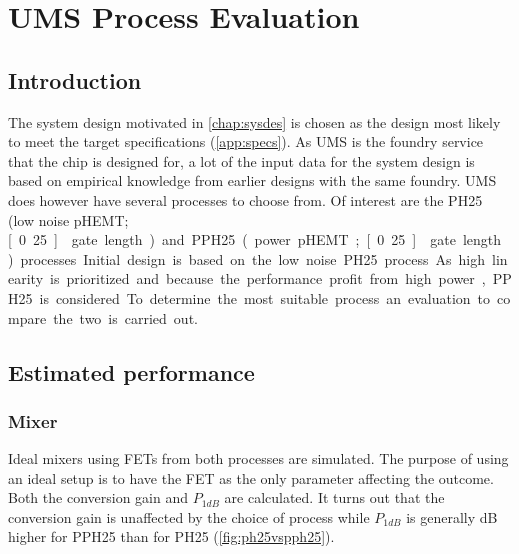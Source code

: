 \chapter{UMS Process Evaluation}\label{sec:processval}
	\section{Introduction}
		The system design motivated in \autoref{chap:sysdes} is chosen as the design most likely to meet the target specifications (\autoref{app:specs}). As UMS is the foundry service that the chip is designed for, a lot of the input data for the system design is based on empirical knowledge from earlier designs with the same foundry. UMS does however have several processes to choose from. Of interest are the PH25 (low noise pHEMT; \unit[0.25]{\mum} gate length) and PPH25 (power pHEMT; \unit[0.25]{\mum} gate length) processes.

		Initial design is based on the low noise PH25 process. As high linearity is prioritized and because the performance profit from high power, PPH25 is considered. To determine the most suitable process an evaluation to compare the two is carried out.

	\section{Estimated performance}

		\subsection{Mixer}
			Ideal mixers using FETs from both processes are simulated. The purpose of using an ideal setup is to have the FET as the only parameter affecting the outcome. Both the conversion gain and $P_{1dB}$ are calculated. It turns out that the conversion gain is unaffected by the choice of process while $P_{1dB}$ is generally \unit[1]{dB} higher for PPH25 than for PH25 (\autoref{fig:ph25vspph25}).

